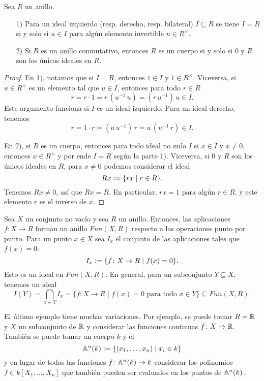 \begin{observacion}
  \label{obs:ideales-y-unidades}
  Sea $R$ un anillo.

  \begin{enumerate}
  \item[1)] Para un ideal izquierdo (resp. derecho, resp. bilateral)
    $I \subseteq R$ se tiene $I = R$ si y solo si $u\in I$ para algún elemento
    invertible $u \in R^\times$.

  \item[2)] Si $R$ es un anillo conmutativo, entonces $R$ es un cuerpo si y solo
    si $0$ y $R$ son los únicos ideales en $R$.
  \end{enumerate}

  \begin{proof}
    En 1), notamos que si $I = R$, entonces $1 \in I$ y
    $1 \in R^\times$. Viceversa, si $u\in R^\times$ es un elemento tal que
    $u \in I$, entonces para todo $r\in R$
    $$r = r\cdot 1 = r\,(u^{-1}\,u) = (r\,u^{-1})\,u \in I.$$
    Este argumento funciona si $I$ es un ideal izquierdo. Para un ideal derecho,
    tenemos
    $$r = 1\cdot r = (u\,u^{-1})\,r = u\,(u^{-1}\,r) \in I.$$

    En 2), si $R$ es un cuerpo, entonces para todo ideal no nulo $I$ si $x\in I$
    y $x\ne 0$, entonces $x\in R^\times$ y por ende $I = R$ según la parte
    1). Viceversa, si $0$ y $R$ son los únicos ideales en $R$, para $x \ne 0$
    podemos considerar el ideal
    $$Rx \dfn \{ rx \mid r\in R \}.$$
    Tenemos $Rx \ne 0$, así que $Rx = R$. En particular, $rx = 1$ para algún
    $r\in R$, y este elemento $r$ es el inverso de $x$.
  \end{proof}
\end{observacion}

\begin{ejemplo}
  Sea $X$ un conjunto no vacío y sea $R$ un anillo. Entonces, las aplicaciones
  $f\colon X\to R$ forman un anillo $Fun (X,R)$ respecto a las operaciones punto
  por punto. Para un punto $x \in X$ sea $I_x$ el conjunto de las aplicaciones
  tales que $f (x) = 0$:
  $$I_x \dfn \{ f\colon X\to R \mid f (x) = 0 \}.$$
  Esto es un ideal en $Fun (X,R)$. En general, para un subconjunto
  $Y \subseteq X$, tenemos un ideal
  \[ I (Y) = \bigcap_{x\in Y} I_x =
     \{ f\colon X\to R \mid f (x) = 0\text{ para todo }x\in Y \} \subseteq
     Fun (X,R). \]
\end{ejemplo}

El último ejemplo tiene muchas variaciones. Por ejemplo, se puede tomar
$R = \RR$ y $X$ un subconjunto de $\RR$ y considerar las funciones continuas
$f\colon X\to \RR$. También se puede tomar un cuerpo $k$ y
el 
$$\AA^n (k) \dfn \{ (x_1,\ldots,x_n) \mid x_i\in k \}$$
y en lugar de todas las funciones $f\colon \AA^n (k) \to k$ considerar
los polinomios $f\in k [X_1,\ldots,X_n]$ que también pueden ser evaluados
en los puntos de $\AA^n (k)$.

